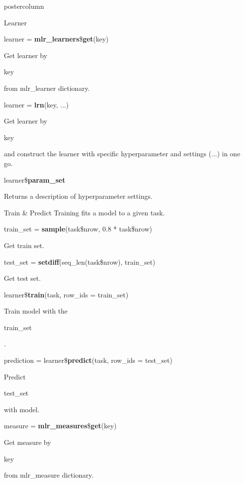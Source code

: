 \documentclass{beamer}
\newcommand{\codeinline}[1]{\begin{codeboxinline}#1\end{codeboxinline}}
\begin{document}
\begin{frame}[fragile]{}
\begin{columns}
\begin{column}{.245\textwidth}
\begin{beamercolorbox}[center]{postercolumn}
\begin{minipage}{.98\textwidth}
{\begin{myblock}{Learner}
							\\
							\begin{codebox}
								learner = \textbf{mlr\_learners}\$\textbf{get}(key)
							\end{codebox}
							Get learner by \codeinline{key} from mlr\_learner dictionary.
							\\
							\begin{codebox}
								learner = \textbf{lrn}(key, ...)
							\end{codebox}
							Get learner by \codeinline{key} and construct the learner with specific hyperparameter and settings (...) in one go.
							\\
							\begin{codebox}
								learner\$\textbf{param\_set}
							\end{codebox}
							Returns a description of hyperparameter settings.
						\end{myblock}
						\begin{myblock}{Train \& Predict}
							Training fits a model to a given task.
							\\
							\begin{codebox}
								train\_set = \textbf{sample}(task\$nrow, 0.8 * task\$nrow)
							\end{codebox}
							Get train set.
							\\
							\begin{codebox}
								test\_set = \textbf{setdiff}(seq\_len(task\$nrow), train\_set)
							\end{codebox}
							Get test set.
							\\
							\begin{codebox}
								learner\$\textbf{train}(task, row\_ids = train\_set)
							\end{codebox}
							Train model with the \codeinline{train\_set}.
							\\
							\begin{codebox}
								prediction = learner\$\textbf{predict}(task, row\_ids = test\_set)
							\end{codebox}
							Predict \codeinline{test\_set} with model.
							\\
							\begin{codebox}
								measure = \textbf{mlr\_measures}\$\textbf{get}(key)
							\end{codebox}
							Get measure by \codeinline{key} from mlr\_measure dictionary.
							\\
							\begin{codebox}

\end{codebox}
\end{myblock}}
\end{minipage}
\end{beamercolorbox}
\end{column}
\end{columns}
\end{frame}
\end{document}
